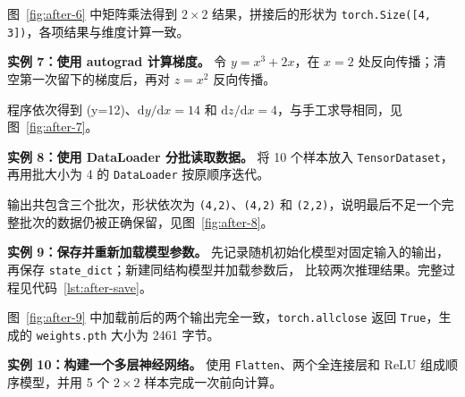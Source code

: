 \documentclass[12pt,a4paper,fontset=fandol]{ctexart}
\begin{document}


图~\ref{fig:after-6} 中矩阵乘法得到 \(2\times2\) 结果，拼接后的形状为
\texttt{torch.Size([4, 3])}，各项结果与维度计算一致。


\noindent\textbf{实例 7：使用 autograd 计算梯度。}
令 \(y=x^3+2x\)，在 \(x=2\) 处反向传播；清空第一次留下的梯度后，再对
\(z=x^2\) 反向传播。



程序依次得到 (y=12)、\(\mathrm{d}y/\mathrm{d}x=14\) 和
\(\mathrm{d}z/\mathrm{d}x=4\)，与手工求导相同，见图~\ref{fig:after-7}。


\noindent\textbf{实例 8：使用 DataLoader 分批读取数据。}
将 10 个样本放入 \texttt{TensorDataset}，再用批大小为 4 的 \texttt{DataLoader}
按原顺序迭代。



输出共包含三个批次，形状依次为 \texttt{(4,2)}、\texttt{(4,2)} 和
\texttt{(2,2)}，说明最后不足一个完整批次的数据仍被正确保留，见图~\ref{fig:after-8}。


\noindent\textbf{实例 9：保存并重新加载模型参数。}
先记录随机初始化模型对固定输入的输出，再保存 \texttt{state\_dict}；新建同结构模型并加载参数后，
比较两次推理结果。完整过程见代码~\ref{lst:after-save}。



图~\ref{fig:after-9} 中加载前后的两个输出完全一致，\texttt{torch.allclose} 返回
\texttt{True}，生成的 \texttt{weights.pth} 大小为 2461 字节。


\noindent\textbf{实例 10：构建一个多层神经网络。}
使用 \texttt{Flatten}、两个全连接层和 ReLU 组成顺序模型，并用 5 个
\(2\times2\) 样本完成一次前向计算。
\end{document}
